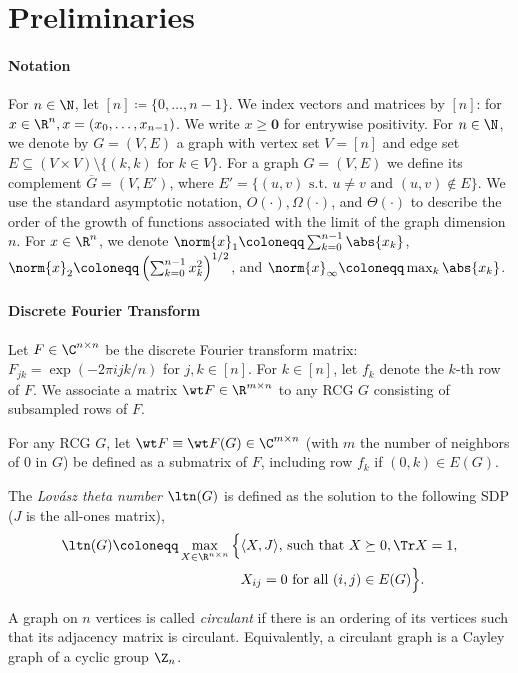 \section{Preliminaries}
\paragraph*{Notation}
For \(n \in \N\), let \([n] \coloneqq \{0, \ldots, n - 1\}\). We index vectors and matrices by \([n]\): for \(x 
\in \R^n, x = (x_0, \ldots, x_{n-1})\). We write \(x \geq \mathbf{0}\) for entrywise positivity.
For \(n \in \N\), we denote by \(G = (V, E)\) a graph with vertex set \(V = [n]\) 
and edge set \(E \subseteq (V \times V) \setminus \{(k, k) \text{ for } k \in V\}\).
For a graph \(G = (V, E)\) we define its complement \(\overline{G} = (V, E')\),
where \(E' = \{(u, v) \text{ s.t. } u \neq v \text{ and } (u, v) \notin E\}\).
We use the standard asymptotic notation, $O(\cdot), \Omega(\cdot)$, and $\Theta(\cdot)$ to describe the order of the growth of functions associated with the limit of the graph dimension $n$. For \(x \in \R^n\), we denote \(\norm{x}_1 \coloneqq \sum_{k=0}^{n - 1} \abs{x_k}\), \(\norm{x}_2 \coloneqq \left(\sum_{k=0}^{n-1} x_k^2\right)^{1/2}\), and \(\norm{x}_{\infty} \coloneqq \max_{k}\abs{x_k}\).

\paragraph*{Discrete Fourier Transform}
Let \(F \in \C^{n \times n}\) be the discrete Fourier transform matrix: \(F_{jk} = \exp(-2 \pi i jk/n)\) for \(j, k \in [n]\). For \(k \in [n]\), let \(f_k\) denote the \(k\)-th row of \(F\).
We associate a matrix \(\wt F \in \R^{m \times n}\) to any RCG $G$ consisting of subsampled rows of \(F\).
\begin{definition}
\label{def:f_tilde}
For any RCG $G$, let $\wt F \equiv \wt F (G) \in \C^{m \times n}$ (with $m$ the number of neighbors of $0$ in $G$)  be defined as a submatrix of \(F\), including row \(f_k\) if $(0,k) \in E(G).$
\end{definition}

\begin{definition}
 The \emph{Lovász theta number} \(\ltn(G)\) is defined as the solution to the following SDP (\(J\) is the all-ones matrix),
\begin{equation}
\label{def:ltn}
\begin{aligned}
    \ltn(G) \coloneqq \max_{X \in \R^{n \times n}}
    \Big\{&\langle X, J \rangle \text{, such that } X \succeq 0, \Tr X = 1, \\
    &X_{ij} = 0\text{ for all }(i, j) \in E(G)\Big\}.
\end{aligned}
\end{equation}
\end{definition}
\begin{definition}
\label{def:circ_graph}
 A graph on $n$ vertices is called \emph{circulant} if there is an ordering of its vertices such that its adjacency matrix is circulant. Equivalently, a circulant graph is a Cayley graph of a cyclic group \(\Z_n\).
\end{definition}

